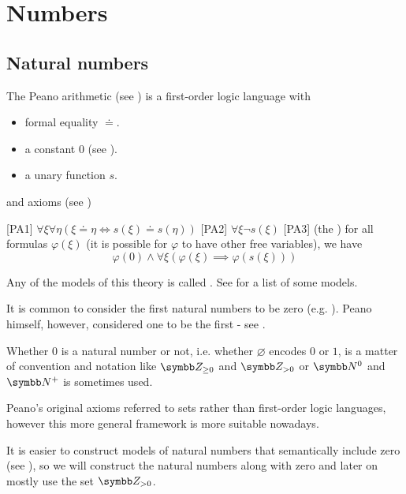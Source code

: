 \section{Numbers}\label{sec:numbers}
\subsection{Natural numbers}\label{subsec:natural_numbers}

\begin{definition}\label{def:peano_arithmetic}\cite[1]{Peano1889}
  The Peano arithmetic (see ) is a first-order logic language with 
  \begin{itemize}
    \item formal equality \( \doteq \).
    \item a constant \( 0 \) (see ).
    \item a unary function \( s \).
  \end{itemize}
  and axioms (see )
  \begin{defenum}
    [PA1] \( \forall \xi \forall \eta (\xi \doteq \eta \iff s(\xi) \doteq s(\eta)) \)
    [PA2] \( \forall \xi \neg s(\xi) \)
    [PA3] (the ) for all formulas \( \varphi(\xi) \) (it is possible for \( \varphi \) to have other free variables), we have
    \begin{equation*}
      \varphi(0) \land \forall \xi (\varphi(\xi) \implies \varphi(s(\xi)))
    \end{equation*}
  \end{defenum}

  Any of the models of this theory is called . See  for a list of some models.
\end{definition}

\begin{remark}\label{remark:peano_arithmetic_zero}
  It is common to consider the first natural numbers to be zero (e.g. \cite[67]{Enderton1977}). Peano himself, however, considered one to be the first - see \cite[1]{Peano1889}.

  Whether \( 0 \) is a natural number or not, i.e. whether \( \varnothing \) encodes \( 0 \) or \( 1 \), is a matter of convention and notation like \( \BZ_{\geq 0} \) and \( \BZ_{>0} \) or \( \BN^0 \) and \( \BN^+ \) is sometimes used.

  Peano's original axioms referred to sets rather than first-order logic languages, however this more general framework is more suitable nowadays.

  It is easier to construct models of natural numbers that semantically include zero (see ), so we will construct the natural numbers along with zero and later on mostly use the set \( \BZ_{>0} \).
\end{remark}

